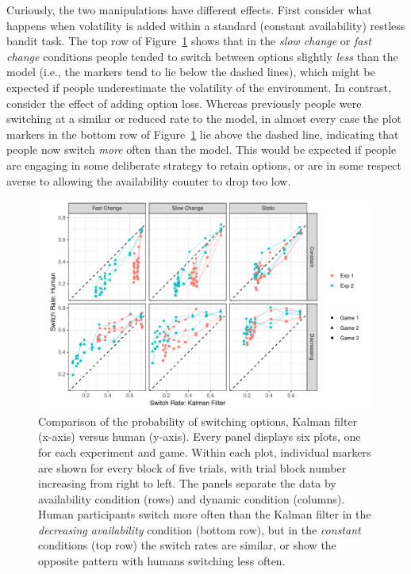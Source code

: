 \documentclass[a4paper,doc,natbib]{apa6}
\begin{document}
Curiously, the two manipulations have different effects.  First consider what happens when volatility is added within a standard (constant availability) restless bandit task. The top row of Figure~\ref{fig:recency} shows that in the {\it slow change} or {\it fast change} conditions  people tended to switch between options slightly {\it less} than the model (i.e., the markers tend to lie below the dashed lines), which might be expected if people underestimate the volatility of the environment. In contrast, consider the effect of adding option loss. Whereas previously people were switching at a similar or reduced rate to the model, in almost every case the plot markers in the bottom row of Figure~\ref{fig:recency} lie above the dashed line, indicating that people now switch {\it more} often than the model. This would be expected if people are engaging in some deliberate strategy to retain options, or are in some respect averse to allowing the availability counter to drop too low.

\begin{figure}[t]
\centering
\includegraphics[width=1\textwidth]{recency_comparison_pic.pdf}
\caption{\small{Comparison of the probability of switching options, Kalman filter (x-axis) versus human (y-axis). Every panel displays six plots, one for each experiment and game. Within each plot, individual markers are shown for every block of five trials, with trial block number increasing from right to left. The panels separate the data by availability condition (rows) and dynamic condition (columns). Human participants switch more often than the Kalman filter in the {\it decreasing availability} condition (bottom row), but in the {\it constant} conditions (top row) the switch rates are similar, or show the opposite pattern with humans switching less often.}}
\label{fig:recency}
\end{figure}
\end{document}
